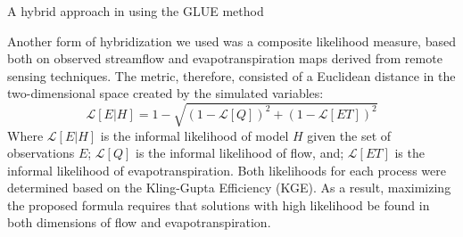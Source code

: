 \documentclass[./main_en.tex]{subfiles}
\begin{document}
\begin{simplebox}[
    float=ht!,
    label={highlight_hybrid_approach},
    nameref={Hybrid exploration}
    ]{A hybrid approach in using the GLUE method}
    \begin{minipage}[t]{\linewidth}    
    \par Another form of hybridization we used was a composite likelihood measure, based both on observed streamflow and evapotranspiration maps derived from remote sensing techniques. The metric, therefore, consisted of a Euclidean distance in the two-dimensional space created by the simulated variables:
    \begin{equation}
        \label{eq:likelihood}
        \mathcal{L}[E|H] = 1 - \sqrt{(1 - \mathcal{L}[Q])^2 + (1 - \mathcal{L}[ET])^2}
    \end{equation}
   Where $\mathcal{L}[E|H]$ is the informal likelihood of model $H$ given the set of observations $E$; $\mathcal{L}[Q]$ is the informal likelihood of flow, and; $\mathcal{L}[ET]$ is the informal likelihood of evapotranspiration. Both likelihoods for each process were determined based on the Kling-Gupta Efficiency (\textsf{\small{KGE}}). As a result, maximizing the proposed formula requires that solutions with high likelihood be found in both dimensions of flow and evapotranspiration.
    \end{minipage}
\label{box:glue}
\normalsize
\end{simplebox}
\end{document}
